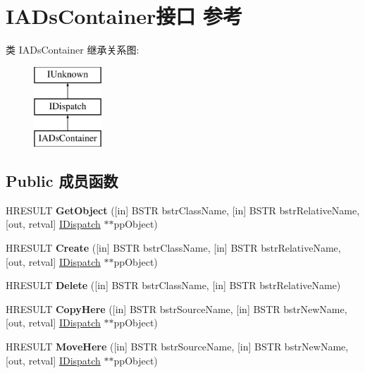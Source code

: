 \hypertarget{interface_i_a_ds_container}{}\section{I\+A\+Ds\+Container接口 参考}
\label{interface_i_a_ds_container}
类 I\+A\+Ds\+Container 继承关系图\+:\begin{figure}[H]
\begin{center}
\leavevmode
\includegraphics[height=3.000000cm]{interface_i_a_ds_container}
\end{center}
\end{figure}
\subsection*{Public 成员函数}
\begin{DoxyCompactItemize}
\item 
\mbox{\label{interface_i_a_ds_container_a726c161870cba79e404379f190640fa2}} 
H\+R\+E\+S\+U\+LT {\bfseries Get\+Object} (\mbox{[}in\mbox{]} B\+S\+TR bstr\+Class\+Name, \mbox{[}in\mbox{]} B\+S\+TR bstr\+Relative\+Name, \mbox{[}out, retval\mbox{]} \hyperlink{interface_i_dispatch}{I\+Dispatch} $\ast$$\ast$pp\+Object)
\item 
\mbox{\label{interface_i_a_ds_container_afd44b24d57b878f283223aed5bc91823}} 
H\+R\+E\+S\+U\+LT {\bfseries Create} (\mbox{[}in\mbox{]} B\+S\+TR bstr\+Class\+Name, \mbox{[}in\mbox{]} B\+S\+TR bstr\+Relative\+Name, \mbox{[}out, retval\mbox{]} \hyperlink{interface_i_dispatch}{I\+Dispatch} $\ast$$\ast$pp\+Object)
\item 
\mbox{\label{interface_i_a_ds_container_ad6e3c87770a4942e34482d3b8535ea07}} 
H\+R\+E\+S\+U\+LT {\bfseries Delete} (\mbox{[}in\mbox{]} B\+S\+TR bstr\+Class\+Name, \mbox{[}in\mbox{]} B\+S\+TR bstr\+Relative\+Name)
\item 
\mbox{\label{interface_i_a_ds_container_a777d9157a13a0dc446f97e4edf7e5b73}} 
H\+R\+E\+S\+U\+LT {\bfseries Copy\+Here} (\mbox{[}in\mbox{]} B\+S\+TR bstr\+Source\+Name, \mbox{[}in\mbox{]} B\+S\+TR bstr\+New\+Name, \mbox{[}out, retval\mbox{]} \hyperlink{interface_i_dispatch}{I\+Dispatch} $\ast$$\ast$pp\+Object)
\item 
\mbox{\label{interface_i_a_ds_container_aee941462661c44d8aa92f52346193566}} 
H\+R\+E\+S\+U\+LT {\bfseries Move\+Here} (\mbox{[}in\mbox{]} B\+S\+TR bstr\+Source\+Name, \mbox{[}in\mbox{]} B\+S\+TR bstr\+New\+Name, \mbox{[}out, retval\mbox{]} \hyperlink{interface_i_dispatch}{I\+Dispatch} $\ast$$\ast$pp\+Object)
\end{DoxyCompactItemize}
